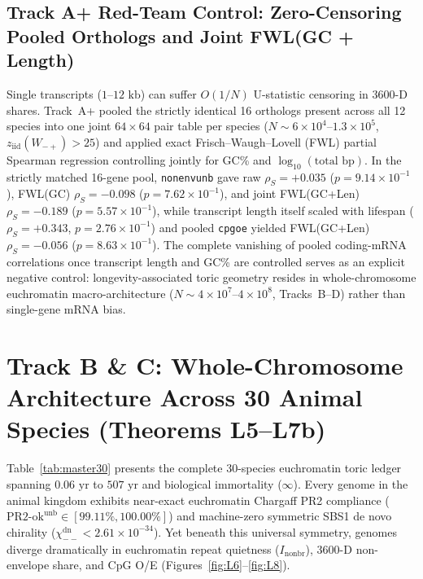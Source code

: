 \documentclass[11pt,a4paper]{article}
\renewcommand{\_}{\origunderscore\penalty200\relax}
\theoremstyle{remark}
\begin{document}
\subsection{Track A+ Red-Team Control: Zero-Censoring Pooled Orthologs and Joint FWL(GC + Length)}
Single transcripts ($1\text{--}12\text{ kb}$) can suffer $O(1/N)$ U-statistic censoring in $3600\text{-D}$ shares. Track~A+ pooled the strictly identical 16 orthologs present across all 12 species into one joint $64\times 64$ pair table per species ($N \sim 6\times 10^4\text{--}1.3\times 10^5$, $z_{\mathrm{iid}}(W_{-+}) > 25$) and applied exact Frisch--Waugh--Lovell (FWL) partial Spearman regression controlling jointly for GC\% and $\log_{10}(\text{total bp})$. In the strictly matched 16-gene pool, \texttt{nonenv\_3600\_unb} gave raw $\rho_S = +0.035$ ($p = 9.14 \times 10^{-1}$), FWL(GC) $\rho_S = -0.098$ ($p = 7.62 \times 10^{-1}$), and joint FWL(GC+Len) $\rho_S = -0.189$ ($p = 5.57 \times 10^{-1}$), while transcript length itself scaled with lifespan ($\rho_S = +0.343$, $p = 2.76 \times 10^{-1}$) and pooled \texttt{cpg\_oe} yielded FWL(GC+Len) $\rho_S = -0.056$ ($p = 8.63 \times 10^{-1}$). The complete vanishing of pooled coding-mRNA correlations once transcript length and GC\% are controlled serves as an explicit negative control: longevity-associated toric geometry resides in whole-chromosome euchromatin macro-architecture ($N \sim 4\times 10^7\text{--}4\times 10^8$, Tracks~B--D) rather than single-gene mRNA bias.

\section{Track B \& C: Whole-Chromosome Architecture Across 30 Animal Species (Theorems L5--L7b)}
Table~\ref{tab:master30} presents the complete 30-species euchromatin toric ledger spanning $0.06\text{ yr}$ to $507\text{ yr}$ and biological immortality ($\infty$).
Every genome in the animal kingdom exhibits near-exact euchromatin Chargaff PR2 compliance ($\mathrm{PR2\text{-}ok}^{\mathrm{unb}} \in [99.11\%, 100.00\%]$) and machine-zero symmetric SBS1 de novo chirality ($\chi_{--}^{\mathrm{dn}} < 2.61\times 10^{-34}$).
Yet beneath this universal symmetry, genomes diverge dramatically in euchromatin repeat quietness ($I_{\mathrm{nonbr}}$), $3600\text{-D}$ non-envelope share, and $\mathrm{CpG}$ O/E (Figures~\ref{fig:L6}--\ref{fig:L8}).
\end{document}
